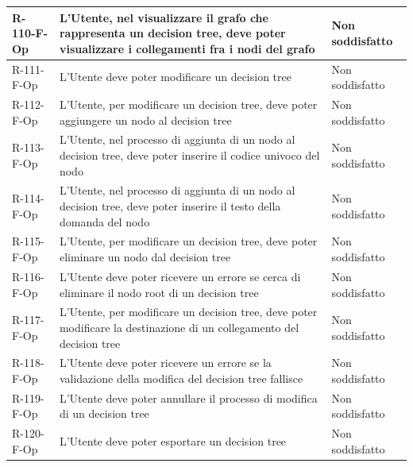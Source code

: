 \documentclass[a4paper,12pt]{article}
\begin{document}
{{\begin{longtable}{|l|p{}|p{}|}
                R-110-F-Op       & L'Utente, nel visualizzare il grafo che rappresenta un decision tree, deve poter visualizzare i collegamenti fra i nodi del grafo                                                           & Non soddisfatto \\ \hline
                R-111-F-Op       & L'Utente deve poter modificare un decision tree                                                                                                                                             & Non soddisfatto \\ \hline
                R-112-F-Op       & L'Utente, per modificare un decision tree, deve poter aggiungere un nodo al decision tree                                                                                                   & Non soddisfatto \\ \hline
                R-113-F-Op       & L'Utente, nel processo di aggiunta di un nodo al decision tree, deve poter inserire il codice univoco del nodo                                                                              & Non soddisfatto \\ \hline
                R-114-F-Op       & L'Utente, nel processo di aggiunta di un nodo al decision tree, deve poter inserire il testo della domanda del nodo                                                                         & Non soddisfatto \\ \hline
                R-115-F-Op       & L'Utente, per modificare un decision tree, deve poter eliminare un nodo dal decision tree                                                                                                   & Non soddisfatto \\ \hline
                R-116-F-Op      & L'Utente deve poter ricevere un errore se cerca di eliminare il nodo root di un decision tree                                                                                               & Non soddisfatto \\ \hline
                R-117-F-Op      & L'Utente, per modificare un decision tree, deve poter modificare la destinazione di un collegamento del decision tree                                                                       & Non soddisfatto \\ \hline
                R-118-F-Op      & L'Utente deve poter ricevere un errore se la validazione della modifica del decision tree fallisce                                                                                          & Non soddisfatto \\ \hline
                R-119-F-Op      & L'Utente deve poter annullare il processo di modifica di un decision tree                                                                                                                   & Non soddisfatto \\ \hline
                R-120-F-Op      & L'Utente deve poter esportare un decision tree                                                                                                                                              & Non soddisfatto \\ \hline
            \end{longtable}
        }

    }
            
    
\end{document}
